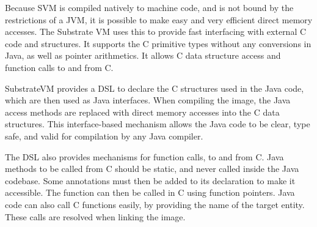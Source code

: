 \documentclass[twoside,11pt,a4paper]{article}
\newcommand{\java}[1]{\textsf{#1}}
\begin{document}
Because SVM is compiled natively to machine code, and is not bound by the restrictions of a JVM, it is possible to make easy and very efficient direct memory accesses. The Substrate VM uses this to provide fast interfacing with external C code and structures. It supports the C primitive types without any conversions in Java, as well as pointer arithmetics. It allows C data structure access and function calls to and from C.

SubstrateVM provides a DSL to declare the C structures used in the Java code, which are then used as Java \java{interface}s. When compiling the image, the Java access methods are replaced with direct memory accesses into the C data structures. This \java{interface}-based mechanism allows the Java code to be clear, type safe, and valid for compilation by any Java compiler.

The DSL also provides mechanisms for function calls, to and from C. Java methods to be called from C should be \java{static}, and never called inside the Java codebase. Some annotations must then be added to its declaration to make it accessible. The function can then be called in C using function pointers. Java code can also call C functions easily, by providing the name of the target entity. These calls are resolved when linking the image.



\end{document}
